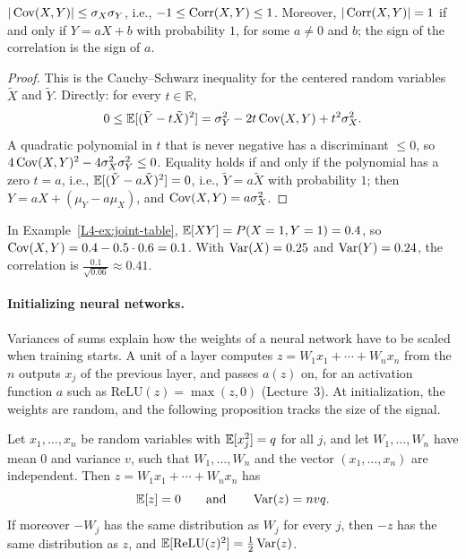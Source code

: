 \begin{theorem}\label{L4-thm:correlation}
    $|\operatorname{Cov}(X, Y)| \leq \sigma_X\sigma_Y$, i.e., $-1 \leq \operatorname{Corr}(X, Y) \leq 1$. Moreover, $|\operatorname{Corr}(X, Y)| = 1$ if and only if $Y = aX + b$ with probability $1$, for some $a \neq 0$ and $b$; the sign of the correlation is the sign of $a$.
\end{theorem}

\begin{proof}
    This is the Cauchy--Schwarz inequality for the centered random variables $\tilde X$ and $\tilde Y$. Directly: for every $t \in \mathbb{R}$,
    \[0 \leq \mathbb{E}[(\tilde Y - t\tilde X)^2] = \sigma_Y^2 - 2t\operatorname{Cov}(X, Y) + t^2\sigma_X^2.\]
    A quadratic polynomial in $t$ that is never negative has a discriminant $\leq 0$, so $4\operatorname{Cov}(X, Y)^2 - 4\sigma_X^2\sigma_Y^2 \leq 0$. Equality holds if and only if the polynomial has a zero $t = a$, i.e., $\mathbb{E}[(\tilde Y - a\tilde X)^2] = 0$, i.e., $\tilde Y = a\tilde X$ with probability $1$; then $Y = aX + (\mu_Y - a\mu_X)$, and $\operatorname{Cov}(X, Y) = a\sigma_X^2$.
\end{proof}

\begin{example}\label{L4-ex:joint-cov}
    In Example~\ref{L4-ex:joint-table}, $\mathbb{E}[XY] = P(X = 1, Y = 1) = 0.4$, so $\operatorname{Cov}(X, Y) = 0.4 - 0.5 \cdot 0.6 = 0.1$. With $\operatorname{Var}(X) = 0.25$ and $\operatorname{Var}(Y) = 0.24$, the correlation is $\frac{0.1}{\sqrt{0.06}} \approx 0.41$.
\end{example}

\paragraph{Initializing neural networks.} Variances of sums explain how the weights of a neural network have to be scaled when training starts. A unit of a layer computes $z = W_1x_1 + \cdots + W_nx_n$ from the $n$ outputs $x_j$ of the previous layer, and passes $a(z)$ on, for an activation function $a$ such as $\mathrm{ReLU}(z) = \max(z, 0)$ (Lecture~3). At initialization, the weights are random, and the following proposition tracks the size of the signal.

\begin{proposition}\label{L4-prop:layer-variance}
    Let $x_1, \ldots, x_n$ be random variables with $\mathbb{E}[x_j^2] = q$ for all $j$, and let $W_1, \ldots, W_n$ have mean $0$ and variance $v$, such that $W_1, \ldots, W_n$ and the vector $(x_1, \ldots, x_n)$ are independent. Then $z = W_1x_1 + \cdots + W_nx_n$ has
    \[\mathbb{E}[z] = 0 \qquad \text{and} \qquad \operatorname{Var}(z) = nvq.\]
    If moreover $-W_j$ has the same distribution as $W_j$ for every $j$, then $-z$ has the same distribution as $z$, and $\mathbb{E}[\mathrm{ReLU}(z)^2] = \frac{1}{2}\operatorname{Var}(z)$.
\end{proposition}

